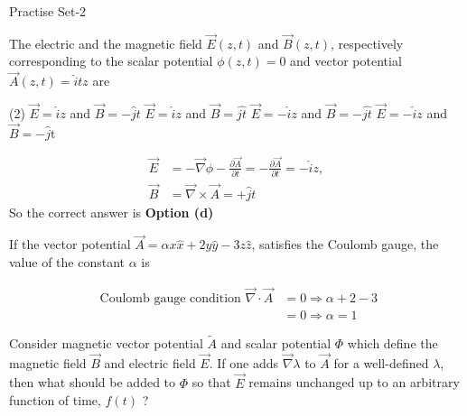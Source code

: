 \newpage
\begin{abox}
	Practise Set-2
\end{abox}
\begin{enumerate}
	\begin{minipage}{\textwidth}
		\item   The electric and the magnetic field $\vec{E}(z, t)$ and $\vec{B}(z, t)$, respectively corresponding to the scalar potential $\phi(z, t)=0$ and vector potential $\vec{A}(z, t)=\hat{i} t z$ are
	\end{minipage}
	\begin{tasks}(2)
		\task[\textbf{a.}] $\vec{E}=\hat{i} z$ and $\vec{B}=-\hat{j} t$
		\task[\textbf{b.}]$\vec{E}=\hat{i} z$ and $\vec{B}=\hat{j t}$
		\task[\textbf{c.}]$\vec{E}=-\hat{i} z$ and $\vec{B}=-\hat{j t}$
		\task[\textbf{d.}]$\vec{E}=-\hat{i} z$ and $\vec{B}=-\hat{j} \mathrm{t}$
	\end{tasks}
\begin{answer}
	\begin{align*}
	\vec{E}&=-\vec{\nabla} \phi-\frac{\partial \vec{A}}{\partial t}=-\frac{\partial \vec{A}}{\partial t}=-\hat{i} z,\\\vec{B}&=\vec{\nabla} \times \vec{A}=+\hat{j} t
	\end{align*}
	So the correct answer is \textbf{Option (d)}
\end{answer}
	\begin{minipage}{\textwidth}
		\item If the vector potential $\vec{A}=\alpha x \hat{x}+2 y \hat{y}-3 z \hat{z}$, satisfies the Coulomb gauge, the value of the constant $\alpha$ is
	\end{minipage}
\begin{answer}
	\begin{align*}
	\text{	Coulomb gauge condition }\vec{\nabla} \cdot \vec{A}&=0 \Rightarrow \alpha+2-3\\&=0 \Rightarrow \alpha=1
	\end{align*}
\end{answer}
	\begin{minipage}{\textwidth}
		\item Consider magnetic vector potential $\tilde{A}$ and scalar potential $\Phi$ which define the magnetic field $\vec{B}$ and electric field $\vec{E}$. If one adds $\vec{\nabla} \lambda$ to $\vec{A}$ for a well-defined $\lambda$, then what should be added to $\Phi$ so that $\vec{E}$ remains unchanged up to an arbitrary function of time, $f(t)$ ?

\end{minipage}
\end{enumerate}
